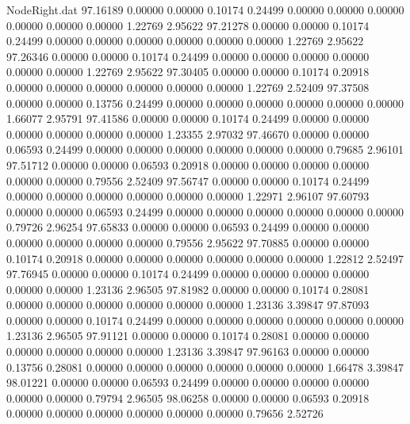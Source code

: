 \begin{filecontents}{NodeRight.dat}
  97.16189    0.00000    0.00000     0.10174    0.24499    0.00000    0.00000    0.00000    0.00000    0.00000    0.00000    1.22769    2.95622
  97.21278    0.00000    0.00000     0.10174    0.24499    0.00000    0.00000    0.00000    0.00000    0.00000    0.00000    1.22769    2.95622
  97.26346    0.00000    0.00000     0.10174    0.24499    0.00000    0.00000    0.00000    0.00000    0.00000    0.00000    1.22769    2.95622
  97.30405    0.00000    0.00000     0.10174    0.20918    0.00000    0.00000    0.00000    0.00000    0.00000    0.00000    1.22769    2.52409
  97.37508    0.00000    0.00000     0.13756    0.24499    0.00000    0.00000    0.00000    0.00000    0.00000    0.00000    1.66077    2.95791
  97.41586    0.00000    0.00000     0.10174    0.24499    0.00000    0.00000    0.00000    0.00000    0.00000    0.00000    1.23355    2.97032
  97.46670    0.00000    0.00000     0.06593    0.24499    0.00000    0.00000    0.00000    0.00000    0.00000    0.00000    0.79685    2.96101
  97.51712    0.00000    0.00000     0.06593    0.20918    0.00000    0.00000    0.00000    0.00000    0.00000    0.00000    0.79556    2.52409
  97.56747    0.00000    0.00000     0.10174    0.24499    0.00000    0.00000    0.00000    0.00000    0.00000    0.00000    1.22971    2.96107
  97.60793    0.00000    0.00000     0.06593    0.24499    0.00000    0.00000    0.00000    0.00000    0.00000    0.00000    0.79726    2.96254
  97.65833    0.00000    0.00000     0.06593    0.24499    0.00000    0.00000    0.00000    0.00000    0.00000    0.00000    0.79556    2.95622
  97.70885    0.00000    0.00000     0.10174    0.20918    0.00000    0.00000    0.00000    0.00000    0.00000    0.00000    1.22812    2.52497
  97.76945    0.00000    0.00000     0.10174    0.24499    0.00000    0.00000    0.00000    0.00000    0.00000    0.00000    1.23136    2.96505
  97.81982    0.00000    0.00000     0.10174    0.28081    0.00000    0.00000    0.00000    0.00000    0.00000    0.00000    1.23136    3.39847
  97.87093    0.00000    0.00000     0.10174    0.24499    0.00000    0.00000    0.00000    0.00000    0.00000    0.00000    1.23136    2.96505
  97.91121    0.00000    0.00000     0.10174    0.28081    0.00000    0.00000    0.00000    0.00000    0.00000    0.00000    1.23136    3.39847
  97.96163    0.00000    0.00000     0.13756    0.28081    0.00000    0.00000    0.00000    0.00000    0.00000    0.00000    1.66478    3.39847
  98.01221    0.00000    0.00000     0.06593    0.24499    0.00000    0.00000    0.00000    0.00000    0.00000    0.00000    0.79794    2.96505
  98.06258    0.00000    0.00000     0.06593    0.20918    0.00000    0.00000    0.00000    0.00000    0.00000    0.00000    0.79656    2.52726

\end{filecontents}
